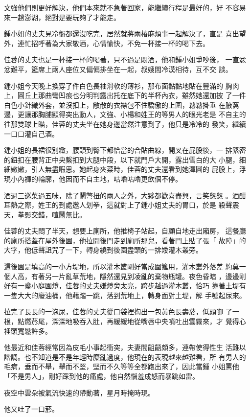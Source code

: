 文強他們則更好解決，他們本來就不急著回家，能繼續行程是最好的，好
不容易來一趟澎湖，絕對是要玩夠了才能走。

鍾小姐的丈夫見冷盤都還沒吃完，居然就將兩樁麻煩事一起解決了，直是
喜出望外，連忙招呼著為大家敬酒，心情愉快，不免一杯接一杯的喝下去。

佳蓉的丈夫也是一杯接一杯的喝著，只不過是悶酒，他和鍾小姐爭吵後，
一直忿忿難平，筵席上兩人座位又偏偏排坐在一起，叔嫂間冷漠相待，互不交
談。

鍾小姐今天晚上換穿了件白色長袖滑軟的薄衫，那布面黏黏地貼在豐滿的
胸肉上，圓丘上那曲彎凹痕也分明判露出托在底下的半杯內衣，雖然她還加披
了一件白色小針織外套，並沒扣上，敞散的衣襟包不住驕傲的上圍，鬆鬆掛垂
在腋窩邊，更讓那胸脯顯得突出動人，文強、小楊和姓王的等男人的眼光老是
不自主的往那雙球上瞄，佳蓉的丈夫坐在她身邊當然注意到了，他只是冷冷的
發笑，繼續一口口灌自己酒。

鍾小姐的長裙很別緻，腰頭到臀下都恰當的合貼曲線，開叉在屁股後，一
排緊密的鈕扣在腰背正中央繫扣到大腿中段，以下就門戶大開，露出雪白的大
小腿，細細嫩嫩，引人無盡暇思。她起身夾菜時，佳蓉的丈夫還看到她渾圓的
屁股上，浮現小內褲的輪廓，他因而不自主地，咕嚕咕嚕更飲個不停。

酒過三巡菜過五味，除了鬧彆扭的兩人之外，大夥都歡喜盡興，言笑慇慇
。酒酣耳熱之際，姓王的到處邀人划拳，這就對上了鍾小姐丈夫的胃口，於是
殺聲震天，拳影交錯，喧鬧無比。

佳蓉的丈夫悶了半天，想要上廁所，他推椅子站起，自顧自地走出廂房，
這餐廳的廁所搭蓋在屋外後園，他拉開後門走到廁所那兒，看著門上貼了張「
故障」的大字，他低聲詛咒了一下，轉身繞到後園盡頭的一排矮灌木叢旁。

這後園是填高的一小方堤地，所以灌木叢剛好當成圍籬用，灌木叢外落差
約莫一個人高，有著另一片亂草荒地，隱然還見到凌亂的棄物瓶罐。夜色昏暗
，邊邊剛好有一盞小庭園燈，佳蓉的丈夫嫌燈旁太亮，跨步越過灌木叢，恰巧
靠著土堤有一隻大大的廢油桶，他藉踏一跳，落到荒地上，轉身面對土堤，解
手噓起尿來。

拉完了長長的一泡尿，佳蓉的丈夫從口袋裡掏出一包黃色長壽菸，低頭啣
了一根，點燃菸尾，深深地吸吞入肚，再緩緩地從嘴唇中央噴吐出雲霧來，才
覺得心裡頭寬鬆許多。

他最近和佳蓉經常因為皮毛小事起衝突，夫妻間齟齬頗多，連帶使得性生
活難以諧調。也不知道是不是年輕時糜亂過度，他現在的表現越來越難看，所
有男人的毛病，垂而不舉，舉而不堅，堅而不久等等全都跑出來了，因此當鍾
小姐罵他「不是男人」，剛好踩到他的痛處，他自然惱羞成怒而暴跳如雷。

夜空中雲朵被氣流快速的帶動著，星月時掩時現。

他又吐了一口菸。

